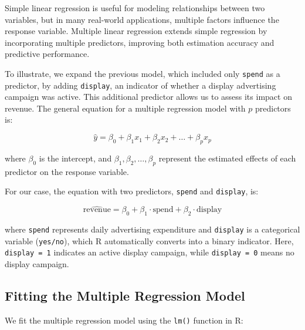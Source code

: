 \documentclass[
]{book}
\newcommand{\passthrough}[1]{#1}
\theoremstyle{definition}
\theoremstyle{definition}
\theoremstyle{definition}
\theoremstyle{definition}
\theoremstyle{remark}
\begin{document}
Simple linear regression is useful for modeling relationships between two variables, but in many real-world applications, multiple factors influence the response variable. Multiple linear regression extends simple regression by incorporating multiple predictors, improving both estimation accuracy and predictive performance.

To illustrate, we expand the previous model, which included only \passthrough{\lstinline!spend!} as a predictor, by adding \passthrough{\lstinline!display!}, an indicator of whether a display advertising campaign was active. This additional predictor allows us to assess its impact on revenue. The general equation for a multiple regression model with \(p\) predictors is:

\[
\hat{y} = \beta_0 + \beta_1 x_1 + \beta_2 x_2 + \dots + \beta_p x_p
\]

where \(\beta_0\) is the intercept, and \(\beta_1, \beta_2, \dots, \beta_p\) represent the estimated effects of each predictor on the response variable.

For our case, the equation with two predictors, \passthrough{\lstinline!spend!} and \passthrough{\lstinline!display!}, is:

\[
\hat{\text{revenue}} = \beta_0 + \beta_1 \cdot \text{spend} + \beta_2 \cdot \text{display}
\]

where \passthrough{\lstinline!spend!} represents daily advertising expenditure and \passthrough{\lstinline!display!} is a categorical variable (\passthrough{\lstinline!yes/no!}), which R automatically converts into a binary indicator. Here, \passthrough{\lstinline!display = 1!} indicates an active display campaign, while \passthrough{\lstinline!display = 0!} means no display campaign.

\subsection*{Fitting the Multiple Regression Model}\label{fitting-the-multiple-regression-model}

We fit the multiple regression model using the \passthrough{\lstinline!lm()!} function in R:
\end{document}
